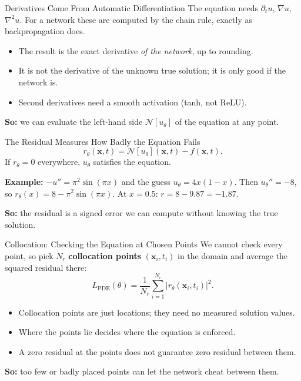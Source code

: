 \documentclass{ntuabeamer}
\begin{document}
\begin{frame}{Derivatives Come From Automatic Differentiation}
  The equation needs \(\partial_tu\), \(\nabla u\), \(\nabla^2u\). For a network these are computed by the chain rule, exactly as backpropagation does.
  \begin{itemize}
    \item The result is the exact derivative \emph{of the network}, up to rounding.
    \item It is not the derivative of the unknown true solution; it is only good if the network is.
    \item Second derivatives need a smooth activation (tanh, not ReLU).
  \end{itemize}
  \textbf{So:} we can evaluate the left-hand side \(\mathcal N[u_\theta]\) of the equation at any point.
\end{frame}

\begin{frame}{The Residual Measures How Badly the Equation Fails}
  \[
    r_\theta(\mathbf x,t)=\mathcal N[u_\theta](\mathbf x,t)-f(\mathbf x,t).
  \]
  If \(r_\theta=0\) everywhere, \(u_\theta\) satisfies the equation.

  \textbf{Example:} \(-u''=\pi^2\sin(\pi x)\) and the guess \(u_\theta=4x(1-x)\).
  Then \(u_\theta''=-8\), so \(r_\theta(x)=8-\pi^2\sin(\pi x)\). At \(x=0.5\): \(r=8-9.87=-1.87\).

  \medskip
  \textbf{So:} the residual is a signed error we can compute without knowing the true solution.
\end{frame}

\begin{frame}{Collocation: Checking the Equation at Chosen Points}
  We cannot check every point, so pick \(N_r\) \textbf{collocation points} \((\mathbf x_i,t_i)\) in the domain and average the squared residual there:
  \[
    L_{\mathrm{PDE}}(\theta)=\frac1{N_r}\sum_{i=1}^{N_r}\big|r_\theta(\mathbf x_i,t_i)\big|^2.
  \]
  \begin{itemize}
    \item Collocation points are just locations; they need no measured solution values.
    \item Where the points lie decides where the equation is enforced.
    \item A zero residual at the points does not guarantee zero residual between them.
  \end{itemize}
  \textbf{So:} too few or badly placed points can let the network cheat between them.
\end{frame}
\end{document}
